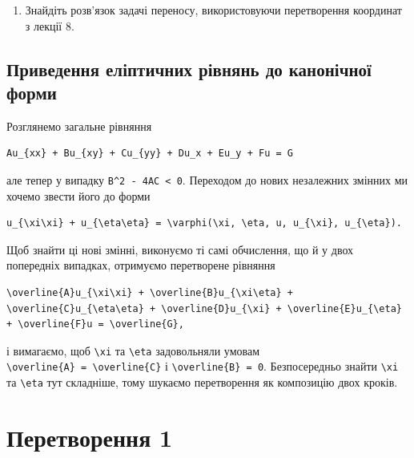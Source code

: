 \documentclass[
  ukrainian,
]{article}
\providecommand{\tightlist}{%
  \setlength{\itemsep}{0pt}\setlength{\parskip}{0pt}}
\begin{document}
\begin{enumerate}
\def\labelenumi{\arabic{enumi}.}
\setcounter{enumi}{2}
\tightlist
\item
  Знайдіть розв'язок задачі переносу, використовуючи перетворення
  координат з лекції 8.
\end{enumerate}

\subsection{Приведення еліптичних рівнянь до канонічної
форми}\label{ux43fux440ux438ux432ux435ux434ux435ux43dux43dux44f-ux435ux43bux456ux43fux442ux438ux447ux43dux438ux445-ux440ux456ux432ux43dux44fux43dux44c-ux434ux43e-ux43aux430ux43dux43eux43dux456ux447ux43dux43eux457-ux444ux43eux440ux43cux438}

Розглянемо загальне рівняння

\begin{verbatim}
Au_{xx} + Bu_{xy} + Cu_{yy} + Du_x + Eu_y + Fu = G
\end{verbatim}

але тепер у випадку \texttt{B\^{}2\ -\ 4AC\ \textless{}\ 0}. Переходом
до нових незалежних змінних ми хочемо звести його до форми

\begin{verbatim}
u_{\xi\xi} + u_{\eta\eta} = \varphi(\xi, \eta, u, u_{\xi}, u_{\eta}).
\end{verbatim}

Щоб знайти ці нові змінні, виконуємо ті самі обчислення, що й у двох
попередніх випадках, отримуємо перетворене рівняння

\begin{verbatim}
\overline{A}u_{\xi\xi} + \overline{B}u_{\xi\eta} + \overline{C}u_{\eta\eta} + \overline{D}u_{\xi} + \overline{E}u_{\eta} + \overline{F}u = \overline{G},
\end{verbatim}

і вимагаємо, щоб \texttt{\textbackslash{}xi} та
\texttt{\textbackslash{}eta} задовольняли умовам
\texttt{\textbackslash{}overline\{A\}\ =\ \textbackslash{}overline\{C\}}
і \texttt{\textbackslash{}overline\{B\}\ =\ 0}. Безпосередньо знайти
\texttt{\textbackslash{}xi} та \texttt{\textbackslash{}eta} тут
складніше, тому шукаємо перетворення як композицію двох кроків.

\section{Перетворення
1}\label{ux43fux435ux440ux435ux442ux432ux43eux440ux435ux43dux43dux44f-1}
\end{document}
